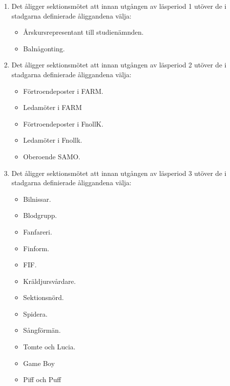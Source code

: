 \documentclass[11pt,a4paper]{article}
\begin{document}
\begin{enumerate}[\thesubsection .1]

  \item Det åligger sektionsmötet att innan utgången av läsperiod 1
  utöver de i stadgarna definierade åliggandena välja:
    \begin{itemize}
      \item Årskursrepresentant till studienämnden.
        \item Balnågonting.
    \end{itemize}

  \item Det åligger sektionsmötet att innan utgången av läsperiod 2
    utöver de i stadgarna definierade åliggandena välja:
    \begin{itemize}
      \item Förtroendeposter i FARM.
      \item Ledamöter i FARM
      \item Förtroendeposter i FnollK.
      \item Ledamöter i Fnollk.
      \item Oberoende SAMO.

    \end{itemize}

  \item Det åligger sektionsmötet att innan utgången av läsperiod 3
    utöver de i stadgarna definierade åliggandena välja:
    \begin{itemize}
      \item Bilnissar.
      \item Blodgrupp.
      \item Fanfareri.
      \item Finform.
      \item FIF.
      \item Kräldjursvårdare.
      \item Sektionsnörd.
      \item Spidera.
      \item Sångförmän.
      \item Tomte och Lucia.
      \item Game Boy
      \item Piff och Puff
    \end{itemize}


\end{enumerate}
\end{document}
